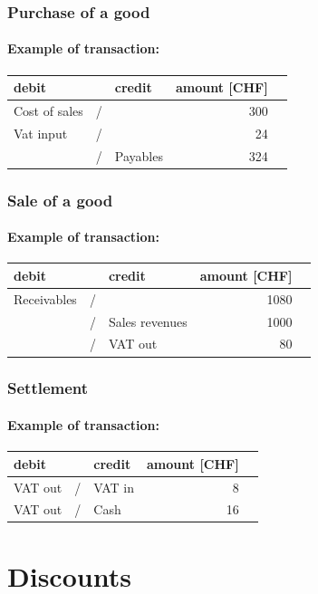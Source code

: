 \documentclass[a4paper] {scrartcl}
\begin{document}
\subsubsection{Purchase of a good}

\paragraph{Example of transaction:}
\begin{tabular}{lllrl}
	\textbf{debit} & & \textbf{credit} & \textbf{amount} [CHF]&\\
	\hline
 	Cost of sales & / & &300&\\
	Vat input&/ & & 24&\\
	&/ &Payables & 324&
\end{tabular}


\subsubsection{Sale of a good}

\paragraph{Example of transaction:}
\begin{tabular}{lllrl}
	\textbf{debit} & & \textbf{credit} & \textbf{amount} [CHF]&\\
	\hline
	Receivables & / & &1080&\\
	&/ &Sales revenues & 1000&\\
	&/ &VAT out & 80&
\end{tabular}

\subsubsection{Settlement}

\paragraph{Example of transaction:}
\begin{tabular}{lllrl}
	\textbf{debit} & & \textbf{credit} & \textbf{amount} [CHF]&\\
	\hline
	VAT out & / & VAT in &8&\\
	VAT out &/ & Cash & 16&
\end{tabular}

\section{Discounts}
\end{document}
